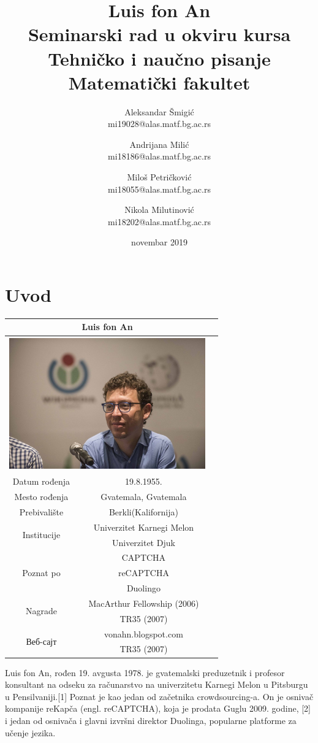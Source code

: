 \documentclass[titlepage, 12pt]{article}
\title{Luis fon An\\ \small{Seminarski rad u okviru kursa\\Tehničko i naučno pisanje\\ Matematički fakultet}}
\author{Aleksandar Šmigić \\ mi19028@alas.matf.bg.ac.rs \and Andrijana Milić \\ mi18186@alas.matf.bg.ac.rs \and Miloš Petričković \\ mi18055@alas.matf.bg.ac.rs \and Nikola Milutinović \\ mi18202@alas.matf.bg.ac.rs}
\date{novembar 2019}
\begin{document}
\maketitle

\tableofcontents
\newpage
\section{Uvod}

{\renewcommand{\arraystretch}{1.2}}
\begin{tabular}{|c|c|c|}
\hline
\multicolumn{2}{|c|}{\Large{Luis fon An}}\\[4px]
\hline
\multicolumn{2}{|c|}{\includegraphics[width=320px,height=216px]{Luis_von_Ahn.jpg}}\\

\hline
Datum rođenja & 19.8.1955. \\
\hline
Mesto rođenja & Gvatemala, Gvatemala\\
\hline
Prebivalište & Berkli(Kalifornija)\\
\hline
\multirow{2}{*}{Institucije}&Univerzitet Karnegi Melon\\
& Univerzitet Djuk \\
\hline 
\multirow{3}{*}{Poznat po} & CAPTCHA \\
& reCAPTCHA \\ & Duolingo \\
\hline
\multirow{2}{*}{Nagrade} & MacArthur Fellowship (2006) \\
 & TR35 (2007)
\\
\hline
\multirow{2}{*}{Веб-сајт} & vonahn.blogspot.com \\
 & TR35 (2007)
\\
\hline
\end{tabular}

\vspace{20px}

Luis fon An, rođen 19. avgusta 1978. je gvatemalski preduzetnik i profesor konsultant na odseku za računarstvo na univerzitetu Karnegi Melon u Pitsburgu u Pensilvaniji.[1] Poznat je kao jedan od začetnika crowdsourcing-a. On je osnivač kompanije reKapča (engl. reCAPTCHA), koja je prodata Guglu 2009. godine, [2] i jedan od osnivača i glavni izvršni direktor Duolinga, popularne platforme za učenje jezika. 
\end{document}
